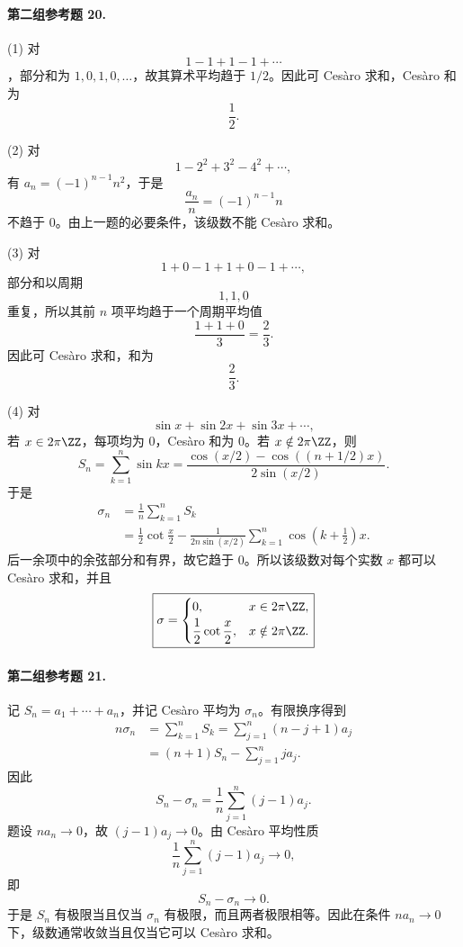 \paragraph{第二组参考题 20.}
\begin{xsolution}
(1) 对
\[
 1-1+1-1+\cdots
\]
，部分和为 $1,0,1,0,\ldots$，故其算术平均趋于 $1/2$。因此可 Cesàro 求和，Cesàro 和为
\[
 \boxed{\frac12}.
\]

(2) 对
\[
 1-2^2+3^2-4^2+\cdots,
\]
有 $a_n=(-1)^{n-1}n^2$，于是
\[
 \frac{a_n}{n}=(-1)^{n-1}n
\]
不趋于 $0$。由上一题的必要条件，该级数不能 Cesàro 求和。

(3) 对
\[
 1+0-1+1+0-1+\cdots,
\]
部分和以周期
\[
 1,1,0
\]
重复，所以其前 $n$ 项平均趋于一个周期平均值
\[
 \frac{1+1+0}{3}=\frac23.
\]
因此可 Cesàro 求和，和为
\[
 \boxed{\frac23}.
\]

(4) 对
\[
 \sin x+\sin2x+\sin3x+\cdots,
\]
若 $x\in2\pi\ZZ$，每项均为 $0$，Cesàro 和为 $0$。若 $x\notin2\pi\ZZ$，则
\[
 S_n=\sum_{k=1}^{n}\sin kx
 =\frac{\cos(x/2)-\cos((n+1/2)x)}{2\sin(x/2)}.
\]
于是
\[
 \begin{aligned}
 \sigma_n
 &=\frac1n\sum_{k=1}^{n}S_k\\
 &=\frac12\cot\frac x2
 -\frac1{2n\sin(x/2)}\sum_{k=1}^{n}\cos\left(k+\frac12\right)x.
 \end{aligned}
\]
后一余项中的余弦部分和有界，故它趋于 $0$。所以该级数对每个实数 $x$ 都可以 Cesàro 求和，并且
\[
 \boxed{
 \sigma=
 \begin{cases}
 0,&x\in2\pi\ZZ,\\[2pt]
 \dfrac12\cot\dfrac x2,&x\notin2\pi\ZZ.
 \end{cases}}
\]
\end{xsolution}

\paragraph{第二组参考题 21.}
\begin{xsolution}
记 $S_n=a_1+\cdots+a_n$，并记 Cesàro 平均为 $\sigma_n$。有限换序得到
\[
 \begin{aligned}
 n\sigma_n
 &=\sum_{k=1}^{n}S_k
 =\sum_{j=1}^{n}(n-j+1)a_j\\
 &=(n+1)S_n-\sum_{j=1}^{n}ja_j.
\end{aligned}
\]
因此
\[
 S_n-\sigma_n
 =\frac1n\sum_{j=1}^{n}(j-1)a_j.
\]
题设 $na_n\to0$，故 $(j-1)a_j\to0$。由 Cesàro 平均性质
\[
 \frac1n\sum_{j=1}^{n}(j-1)a_j\longrightarrow0,
\]
即
\[
 S_n-\sigma_n\to0.
\]
于是 $S_n$ 有极限当且仅当 $\sigma_n$ 有极限，而且两者极限相等。因此在条件 $na_n\to0$ 下，级数通常收敛当且仅当它可以 Cesàro 求和。
\end{xsolution}

